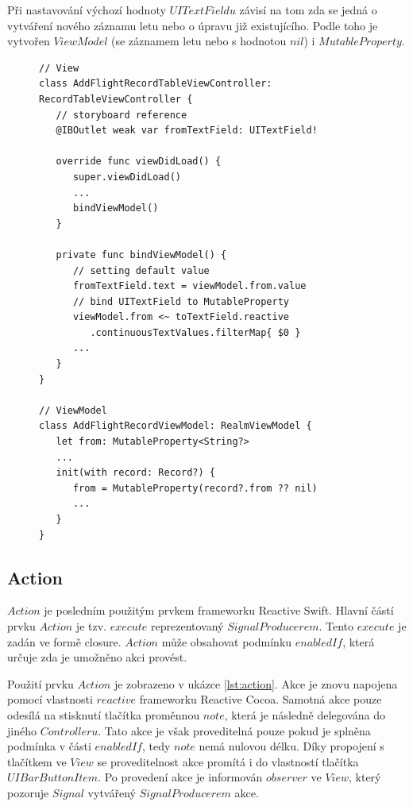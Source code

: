 \documentclass[thesis=M,czech]{FITthesis}[2012/06/26]
\begin{document}
Při nastavování výchozí hodnoty $UITextFieldu$ závisí na tom zda se jedná o vytváření nového záznamu letu nebo o úpravu již existujícího. Podle toho je vytvořen $ViewModel$ (se záznamem letu nebo s hodnotou $nil$) i $MutableProperty$.

\begin{figure}
\begin{minipage}{\linewidth}
\begin{lstlisting}[caption={Ukázka propojení $View$ a $ViewModel$},label={lst:property}]
// View
class AddFlightRecordTableViewController: 
RecordTableViewController {
   // storyboard reference
   @IBOutlet weak var fromTextField: UITextField!

   override func viewDidLoad() {
      super.viewDidLoad()
      ...
      bindViewModel()
   }

   private func bindViewModel() {
      // setting default value
      fromTextField.text = viewModel.from.value
      // bind UITextField to MutableProperty
      viewModel.from <~ toTextField.reactive
         .continuousTextValues.filterMap{ $0 }
      ...
   }
}

// ViewModel
class AddFlightRecordViewModel: RealmViewModel {
   let from: MutableProperty<String?>
   ...
   init(with record: Record?) {
      from = MutableProperty(record?.from ?? nil)
      ...
   }
}
\end{lstlisting}
\end{minipage}
\end{figure}	

\subsection{Action}
$Action$ je posledním použitým prvkem frameworku Reactive Swift. Hlavní částí prvku $Action$ je tzv. $execute$ reprezentovaný $SignalProducerem$. Tento $execute$ je zadán ve formě closure. $Action$ může obsahovat podmínku $enabledIf$, která určuje zda je umožněno akci provést.

Použití prvku $Action$ je zobrazeno v ukázce \ref{lst:action}. Akce je znovu napojena pomocí vlastnosti $reactive$ frameworku Reactive Cocoa. Samotná akce pouze odesílá na stisknutí tlačítka proměnnou $note$, která je následně delegována do jiného $Controlleru$. Tato akce je však proveditelná pouze pokud je splněna podmínka v části $enabledIf$, tedy $note$ nemá nulovou délku. Díky propojení s tlačítkem ve $View$ se proveditelnost akce promítá i do vlastností tlačítka $UIBarButtonItem$. Po provedení akce je informován $observer$ ve $View$, který pozoruje $Signal$ vytvářený $SignalProducerem$ akce.
\end{document}
